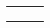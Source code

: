 \documentclass[10pt,a4paper]{article}
\begin{document}
\begin{tabular}{C{0.3090\textwidth} C{0.3075\textwidth} C{0.3065\textwidth}}
{%
\vspace*{0.345em}\\%
\vspace*{0.345em}\\%
%
}& \shortstack[c]{
%
%
}
\end{tabular}
\end{document}
